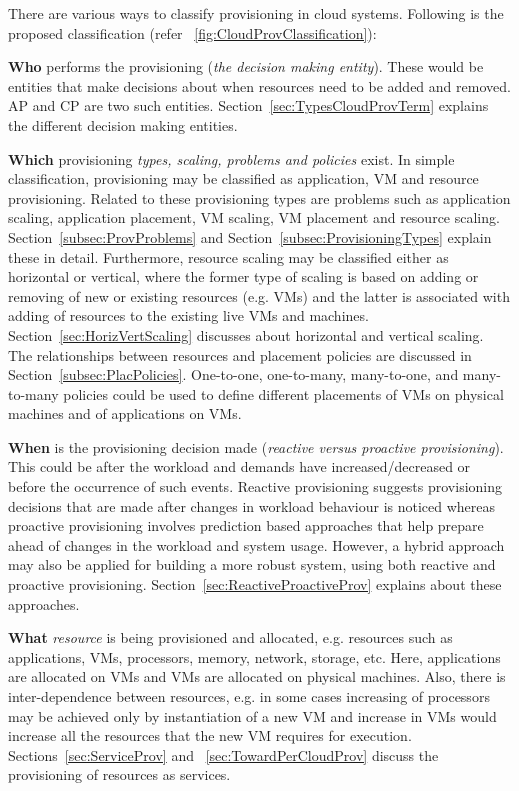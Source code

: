 \documentclass[10pt,journal,cspaper,compsoc]{IEEEtran}
\begin{document}
There are various ways to classify provisioning in cloud systems. Following is the proposed classification (refer \figurename~\ref{fig:CloudProvClassification}):
\begin{IEEEitemize}
\item \textbf{Who} performs the provisioning (\textit{the decision making entity}). These would be entities that make decisions about when resources need to be added and removed. AP and CP are two such entities. Section~\ref{sec:TypesCloudProvTerm} explains the different decision making entities.
\item \textbf{Which} provisioning \textit{types, scaling, problems and policies} exist. In simple classification, provisioning may be classified as application, VM and resource provisioning. Related to these provisioning types are problems such as application scaling, application placement, VM scaling, VM placement and resource scaling. Section~\ref{subsec:ProvProblems} and Section~\ref{subsec:ProvisioningTypes} explain these in detail. Furthermore, resource scaling may be classified either as horizontal or vertical, where the former type of scaling is based on adding or removing of new or existing resources (e.g. VMs) and the latter is associated with adding of resources to the existing live VMs and machines. Section~\ref{sec:HorizVertScaling} discusses about horizontal and vertical scaling. The relationships between resources and placement policies are discussed in Section~\ref{subsec:PlacPolicies}. One-to-one, one-to-many, many-to-one, and many-to-many policies could be used to define different placements of VMs on physical machines and of applications on VMs.
\item \textbf{When} is the provisioning decision made (\textit{reactive versus proactive provisioning}). This could be after the workload and demands have increased/decreased or before the occurrence of such events. Reactive provisioning suggests provisioning decisions that are made after changes in workload behaviour is noticed whereas proactive provisioning involves prediction based approaches that help prepare ahead of changes in the workload and system usage. However, a hybrid approach may also be applied for building a more robust system, using both reactive and proactive provisioning. Section~\ref{sec:ReactiveProactiveProv} explains about these approaches.
\item \textbf{What} \textit{resource} is being provisioned and allocated, e.g. resources such as applications, VMs, processors, memory, network, storage, etc. Here, applications are allocated on VMs and VMs are allocated on physical machines. Also, there is inter-dependence between resources, e.g. in some cases increasing of processors may be achieved only by instantiation of a new VM and increase in VMs would increase all the resources that the new VM requires for execution. Sections~\ref{sec:ServiceProv} and ~\ref{sec:TowardPerCloudProv} discuss the provisioning of resources as services.

\end{IEEEitemize}
\end{document}
